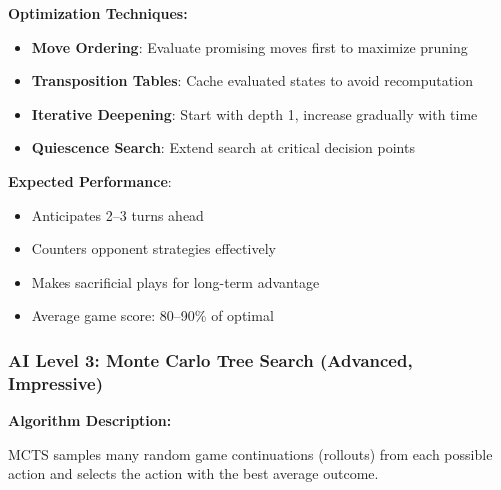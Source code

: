 \documentclass[12pt,a4paper]{article}
\begin{document}
\textbf{Optimization Techniques:}
\begin{itemize}
    \item \textbf{Move Ordering}: Evaluate promising moves first to maximize pruning
    \item \textbf{Transposition Tables}: Cache evaluated states to avoid recomputation
    \item \textbf{Iterative Deepening}: Start with depth 1, increase gradually with time
    \item \textbf{Quiescence Search}: Extend search at critical decision points
\end{itemize}

\textbf{Expected Performance}:
\begin{itemize}
    \item Anticipates 2--3 turns ahead
    \item Counters opponent strategies effectively
    \item Makes sacrificial plays for long-term advantage
    \item Average game score: 80--90\% of optimal
\end{itemize}

\subsubsection{AI Level 3: Monte Carlo Tree Search (Advanced, Impressive)}

\textbf{Algorithm Description:}

MCTS samples many random game continuations (rollouts) from each possible action and selects the action with the best average outcome.
\end{document}
